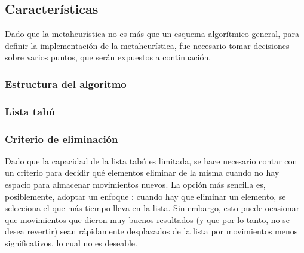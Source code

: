 \subsection{Características}
Dado que la metaheurística no es más que un esquema algorítmico general, para
definir la implementación de la metaheurística, fue necesario tomar decisiones
sobre varios puntos, que serán expuestos a continuación.

\subsubsection{Estructura del algoritmo}

\subsubsection{Lista tabú}

\subsubsection{Criterio de eliminación}
Dado que la capacidad de la lista tabú es limitada, se hace necesario contar
con un criterio para decidir qué elementos eliminar de la misma cuando no hay
espacio para almacenar movimientos nuevos. La opción más sencilla es,
posiblemente, adoptar un enfoque : cuando hay que eliminar un
elemento, se selecciona el que más tiempo lleva en la lista. Sin embargo, esto
puede ocasionar que movimientos que dieron muy buenos resultados (y que por
lo tanto, no se desea revertir) sean rápidamente desplazados de la lista por
movimientos menos significativos, lo cual no es deseable.

